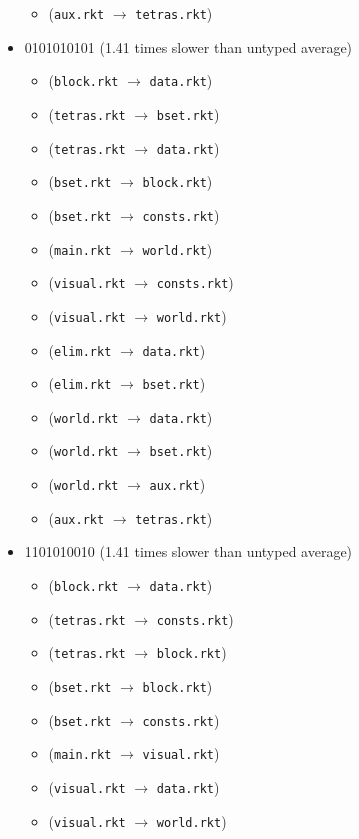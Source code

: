 \documentclass{article}
\newcommand{\mono}[1]{\texttt{#1}}
\begin{document}
\begin{itemize}
\begin{itemize}
  \item (\mono{aux.rkt} $\rightarrow$ \mono{tetras.rkt})
  \end{itemize}
\item 0101010101 (1.41 times slower than untyped average)
  \begin{itemize}
  \item (\mono{block.rkt} $\rightarrow$ \mono{data.rkt})
  \item (\mono{tetras.rkt} $\rightarrow$ \mono{bset.rkt})
  \item (\mono{tetras.rkt} $\rightarrow$ \mono{data.rkt})
  \item (\mono{bset.rkt} $\rightarrow$ \mono{block.rkt})
  \item (\mono{bset.rkt} $\rightarrow$ \mono{consts.rkt})
  \item (\mono{main.rkt} $\rightarrow$ \mono{world.rkt})
  \item (\mono{visual.rkt} $\rightarrow$ \mono{consts.rkt})
  \item (\mono{visual.rkt} $\rightarrow$ \mono{world.rkt})
  \item (\mono{elim.rkt} $\rightarrow$ \mono{data.rkt})
  \item (\mono{elim.rkt} $\rightarrow$ \mono{bset.rkt})
  \item (\mono{world.rkt} $\rightarrow$ \mono{data.rkt})
  \item (\mono{world.rkt} $\rightarrow$ \mono{bset.rkt})
  \item (\mono{world.rkt} $\rightarrow$ \mono{aux.rkt})
  \item (\mono{aux.rkt} $\rightarrow$ \mono{tetras.rkt})
  \end{itemize}
\item 1101010010 (1.41 times slower than untyped average)
  \begin{itemize}
  \item (\mono{block.rkt} $\rightarrow$ \mono{data.rkt})
  \item (\mono{tetras.rkt} $\rightarrow$ \mono{consts.rkt})
  \item (\mono{tetras.rkt} $\rightarrow$ \mono{block.rkt})
  \item (\mono{bset.rkt} $\rightarrow$ \mono{block.rkt})
  \item (\mono{bset.rkt} $\rightarrow$ \mono{consts.rkt})
  \item (\mono{main.rkt} $\rightarrow$ \mono{visual.rkt})
  \item (\mono{visual.rkt} $\rightarrow$ \mono{data.rkt})
  \item (\mono{visual.rkt} $\rightarrow$ \mono{world.rkt})

\end{itemize}
\end{itemize}
\end{document}
